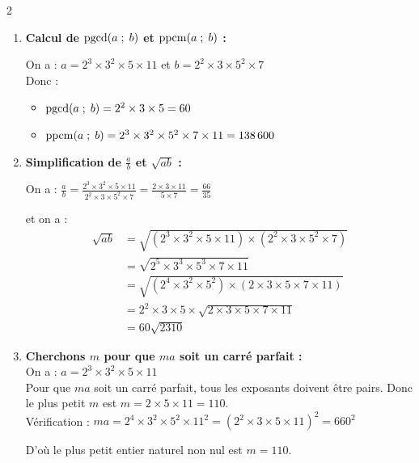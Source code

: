 \documentclass[10pt, a4paper]{article}
\begin{document}
\begin{multicols*}{2}
\begin{Solution}[APPLICATION][12]
\begin{enumerate}[leftmargin=*,itemsep=0.5pt]
\begin{multicols}{2}
    \end{multicols}
        Donc $a = 2^3 \times 3^2 \times 5 \times 11$ \quad et \quad $b = 2^2 \times 3 \times 5^2 \times 7$.

    \item \textbf{Calcul de $\operatorname{pgcd}(a \; ; \; b)$ et $\operatorname{ppcm}(a \; ; \; b)$ :}

    On a : $a = 2^3 \times 3^2 \times 5 \times 11$ \quad et \quad $b = 2^2 \times 3 \times 5^2 \times 7$ \\
    Donc :
    \begin{itemize}[leftmargin=*,itemsep=0.5pt]
        \item $\operatorname{pgcd}(a \; ; \; b) = 2^2 \times 3 \times 5  = 60$

        \item $\operatorname{ppcm}(a \; ; \; b) = 2^3 \times 3^2 \times 5^2 \times 7 \times 11 = 138\,600$
    \end{itemize}

    \item \textbf{Simplification de $\frac{a}{b}$ et $\sqrt{ab}$ :}

    On a : \quad
    $\frac{a}{b} = \frac{2^3 \times 3^2 \times 5 \times 11}{2^2 \times 3 \times 5^2 \times 7} = \frac{2 \times 3 \times 11}{5 \times 7} = \frac{66}{35}$

    et on a :
    \begin{align*}
        \sqrt{ab} &= \sqrt{(2^3 \times 3^2 \times 5 \times 11) \times (2^2 \times             3 \times 5^2 \times 7)} \\
                  &= \sqrt{2^5 \times 3^3 \times 5^3 \times 7 \times 11} \\
                  &= \sqrt{(2^4 \times 3^2 \times 5^2) \times (2 \times 3 \times 5 \times 7 \times 11)} \\
                  &= 2^2 \times 3 \times 5 \times \sqrt{2 \times 3 \times 5 \times 7 \times 11} \\
                  &= 60\sqrt{2310}
    \end{align*}

    \item \textbf{Cherchons $m$ pour que $ma$ soit un carré parfait :} \\
    On a : \quad $a = 2^3 \times 3^2 \times 5 \times 11$ \\
    Pour que $ma$ soit un carré parfait, tous les exposants doivent être pairs. 
    Donc le plus petit $m$ est $m = 2 \times 5 \times 11 = 110$. \\
    Vérification : $ma = 2^4 \times 3^2 \times 5^2 \times 11^2 = (2^2 \times 3 \times 5 \times 11)^2 = 660^2$
    
    D'où le plus petit entier naturel non nul est $m = 110$.
\end{enumerate}
\end{Solution}


\end{multicols*}
\end{document}
